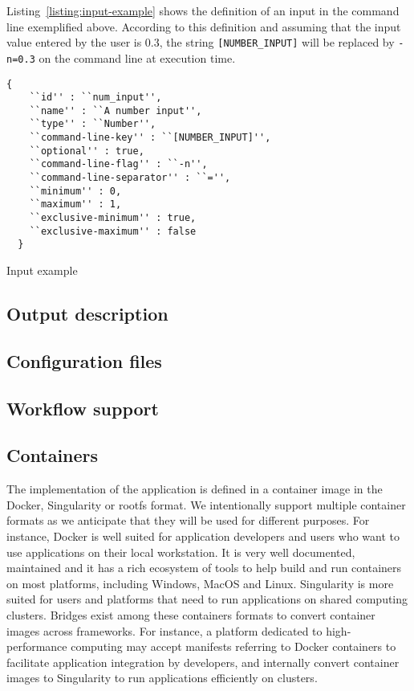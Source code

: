 \documentclass{article}
\begin{document}
Listing~\ref{listing:input-example} shows the definition of an input
in the command line exemplified above. According to this definition
and assuming that the input value entered by the user is 0.3, the
string \texttt{[NUMBER\_INPUT]} will be replaced by \texttt{-n=0.3} on
the command line at execution time.
\begin{listing}
\begin{verbatim}
{
    ``id'' : ``num_input'',
    ``name'' : ``A number input'',
    ``type'' : ``Number'',
    ``command-line-key'' : ``[NUMBER_INPUT]'',
    ``optional'' : true,
    ``command-line-flag'' : ``-n'',
    ``command-line-separator'' : ``='',
    ``minimum'' : 0,
    ``maximum'' : 1,
    ``exclusive-minimum'' : true,
    ``exclusive-maximum'' : false
  }
\end{verbatim}
\caption{Input example} 
\label{listing:input-example}
\end{listing}

\subsection{Output description}

\subsection{Configuration files}

\subsection{Workflow support}

\subsection{Containers}

The implementation of the application is defined in a container image
in the Docker, Singularity or rootfs format. We intentionally support
multiple container formats as we anticipate that they will be used for
different purposes. For instance, Docker is well suited for
application developers and users who want to use applications on their
local workstation. It is very well documented, maintained and it has a
rich ecosystem of tools to help build and run containers on most
platforms, including Windows, MacOS and Linux. Singularity is more
suited for users and platforms that need to run applications on shared
computing clusters. Bridges exist among these containers formats to
convert container images across frameworks. For instance, a platform
dedicated to high-performance computing may accept manifests referring
to Docker containers to facilitate application integration by
developers, and internally convert container images to Singularity to
run applications efficiently on clusters.
\end{document}
